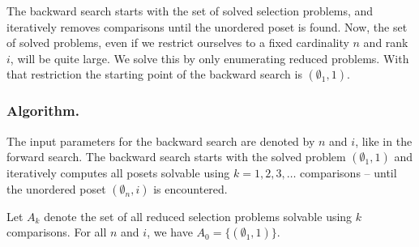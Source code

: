 \documentclass[twoside,leqno,twocolumn]{article}
\begin{document}
The backward search starts with the set of solved selection problems, and iteratively removes comparisons until the unordered poset is found.
Now, the set of solved problems, even if we restrict ourselves to a fixed cardinality $n$ and rank $i$, will be quite large.
We solve this by only enumerating reduced problems.
With that restriction the starting point of the backward search is $(\emptyset_1, 1)$.

%



\subsubsection{Algorithm.} \label{sec:backward:algorithm}
The input parameters for the backward search are denoted by $n$ and $i$, like in the forward search.
The backward search starts with the solved problem $(\emptyset_1, 1)$ and iteratively computes all posets solvable using $k = 1, 2, 3, \dots$ comparisons -- until the unordered poset $(\emptyset_n, i)$ is encountered.

Let $A_k$ denote the set of all reduced selection problems solvable using $k$ comparisons.
For all $n$ and $i$, we have $A_0 = \{ (\emptyset_1, 1) \}$.
\end{document}
